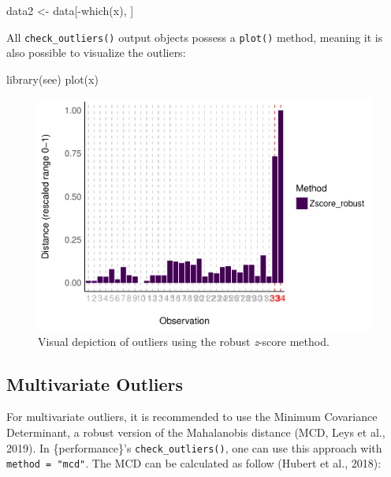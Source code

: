 \documentclass[
]{article}
\newenvironment{Shaded}{\begin{snugshade}}{\end{snugshade}}
\newcommand{\FunctionTok}[1]{\textcolor[rgb]{0.00,0.00,0.00}{#1}}
\newcommand{\NormalTok}[1]{#1}
\newcommand{\OtherTok}[1]{\textcolor[rgb]{0.56,0.35,0.01}{#1}}
\newcommand{\SpecialCharTok}[1]{\textcolor[rgb]{0.00,0.00,0.00}{#1}}
\begin{document}
\begin{Shaded}
\begin{Highlighting}[]
\NormalTok{data2 }\OtherTok{\textless{}{-}}\NormalTok{ data[}\SpecialCharTok{{-}}\FunctionTok{which}\NormalTok{(x), ]}
\end{Highlighting}
\end{Shaded}

All \texttt{check\_outliers()} output objects possess a \texttt{plot()} method, meaning it is also possible to visualize the outliers:



\begin{Shaded}
\begin{Highlighting}[]
\FunctionTok{library}\NormalTok{(see)}
\FunctionTok{plot}\NormalTok{(x)}
\end{Highlighting}
\end{Shaded}

\begin{figure}
\includegraphics[width=1\linewidth]{paper_files/figure-latex/univariate-1} \caption{Visual depiction of outliers using the robust \emph{z}-score method.}\label{fig:univariate}
\end{figure}

\hypertarget{multivariate-outliers}{%
\subsection{Multivariate Outliers}\label{multivariate-outliers}}

For multivariate outliers, it is recommended to use the Minimum Covariance Determinant, a robust version of the Mahalanobis distance (MCD, Leys et al., 2019). In \{performance\}'s \texttt{check\_outliers()}, one can use this approach with \texttt{method\ =\ "mcd"}. The MCD can be calculated as follow (Hubert et al., 2018):
\end{document}

